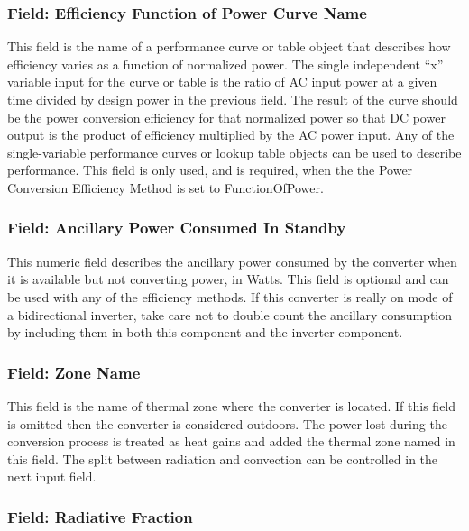 \subsubsection{Field: Efficiency Function of Power Curve Name}\label{field-efficiency-function-of-power-curve-name-1}

This field is the name of a performance curve or table object that describes how efficiency varies as a function of normalized power. The single independent ``x'' variable input for the curve or table is the ratio of AC input power at a given time divided by design power in the previous field. The result of the curve should be the power conversion efficiency for that normalized power so that DC power output is the product of efficiency multiplied by the AC power input. Any of the single-variable performance curves or lookup table objects can be used to describe performance. This field is only used, and is required, when the the Power Conversion Efficiency Method is set to FunctionOfPower.

\subsubsection{Field: Ancillary Power Consumed In Standby}\label{field-ancillary-power-consumed-in-standby-1}

This numeric field describes the ancillary power consumed by the converter when it is available but not converting power, in Watts. This field is optional and can be used with any of the efficiency methods. If this converter is really on mode of a bidirectional inverter, take care not to double count the ancillary consumption by including them in both this component and the inverter component.

\subsubsection{Field: Zone Name}\label{field-zone-name-4-000}

This field is the name of thermal zone where the converter is located. If this field is omitted then the converter is considered outdoors. The power lost during the conversion process is treated as heat gains and added the thermal zone named in this field. The split between radiation and convection can be controlled in the next input field.

\subsubsection{Field: Radiative Fraction}\label{field-zone-rad-fract}

